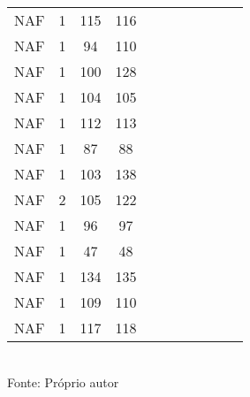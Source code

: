 \begin{table}[H]
{\begin{tabular}{ccccccccccc}
NAF & 1 & 115 & 116 &  &  &  &  &  &  &  \\
NAF & 1 & 94 & 110 &  &  &  &  &  &  &  \\
NAF & 1 & 100 & 128 &  &  &  &  &  &  &  \\
NAF & 1 & 104 & 105 &  &  &  &  &  &  &  \\
NAF & 1 & 112 & 113 &  &  &  &  &  &  &  \\
NAF & 1 & 87 & 88 &  &  &  &  &  &  &  \\
NAF & 1 & 103 & 138 &  &  &  &  &  &  &  \\
NAF & 2 & 105 & 122 &  &  &  &  &  &  &  \\
NAF & 1 & 96 & 97 &  &  &  &  &  &  &  \\
NAF & 1 & 47 & 48 &  &  &  &  &  &  &  \\
NAF & 1 & 134 & 135 &  &  &  &  &  &  &  \\
NAF & 1 & 109 & 110 &  &  &  &  &  &  &  \\
NAF & 1 & 117 & 118 &  &  &  &  &  &  &  \\
\bottomrule
\end{tabular}}
\\Fonte: Próprio autor
\end{table}


